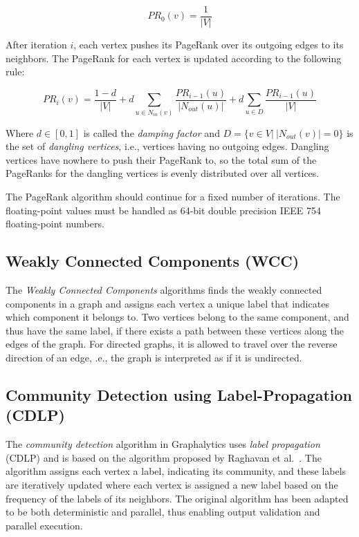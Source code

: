 \begin{equation}
PR_0(v) = \frac{1}{|V|}
\end{equation}

After iteration $i$, each vertex pushes its PageRank over its outgoing edges to its neighbors. The PageRank for each vertex is updated according to the following rule:

\begin{equation}
PR_i(v) = \frac{1-d}{|V|} + d \sum_{u \in N_{in}(v)} \frac{PR_{i - 1}(u)}{|N_{out}(u)|} + d \sum_{u \in D} \frac{PR_{i - 1}(u)}{|V|}
\end{equation}

Where $d \in [0,1]$ is called the \emph{damping factor} and $D=\{v \in V |~|N_{out}(v)| = 0\}$ is the set of \emph{dangling vertices}, i.e., vertices having no outgoing edges. Dangling vertices have nowhere to push their PageRank to, so the total sum of the PageRanks for the dangling vertices is evenly distributed over all vertices. 

The PageRank algorithm should continue for a fixed number of iterations. The floating-point values must be handled as 64-bit double precision IEEE 754 floating-point numbers. 


\subsection{Weakly Connected Components (WCC)}
The \emph{Weakly Connected Components} algorithms finds the weakly connected components in a graph and assigns each vertex a unique label that indicates which component it belongs to. Two vertices belong to the same component, and thus have the same label, if there exists a path between these vertices along the edges of the graph. For directed graphs, it is allowed to travel over the reverse direction of an edge, .e., the graph is interpreted as if it is undirected.

\subsection{Community Detection using Label-Propagation (CDLP)}
The \emph{community detection} algorithm in Graphalytics uses \emph{label propagation} (CDLP) and is based on the algorithm proposed by Raghavan et al.~\cite{raghavan2007near}. The algorithm assigns each vertex a label, indicating its community, and these labels are iteratively updated where each vertex is assigned a new label based on the frequency of the labels of its neighbors. The original algorithm has been adapted to be both deterministic and parallel, thus enabling output validation and parallel execution.

